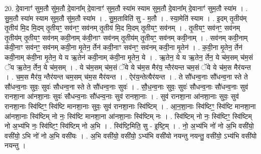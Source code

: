 \documentclass[17pt]{extarticle}
\begin{document}
20. दे॒वानाꣳ॑ सुम॒तौ सु॑म॒तौ दे॒वाना᳚म् दे॒वानाꣳ॑ सुम॒तौ स्या॑म स्याम सुम॒तौ दे॒वाना᳚म् दे॒वानाꣳ॑ सुम॒तौ स्या॑म । . सु॒म॒तौ स्या॑म स्याम सुम॒तौ सु॑म॒तौ स्या॑म । . सु॒म॒ताविति॑ सु - म॒तौ । . स्या॒मेति॑ स्याम । . इ॒दम् तृ॒तीय॑म् तृ॒तीय॑ मि॒द मि॒दम् तृ॒तीयꣳ॒॒ सव॑नꣳ॒॒ सव॑नम् तृ॒तीय॑ मि॒द मि॒दम् तृ॒तीयꣳ॒॒ सव॑नम् । . तृ॒तीयꣳ॒॒ सव॑नꣳ॒॒ सव॑नम् तृ॒तीय॑म् तृ॒तीयꣳ॒॒ सव॑नम् कवी॒नाम् क॑वी॒नाꣳ सव॑नम् तृ॒तीय॑म् तृ॒तीयꣳ॒॒ सव॑नम् कवी॒नाम् । . सव॑नम् कवी॒नाम् क॑वी॒नाꣳ सव॑नꣳ॒॒ सव॑नम् कवी॒ना मृ॒तेन॒ र्तेन॑ कवी॒नाꣳ सव॑नꣳ॒॒ सव॑नम् कवी॒ना मृ॒तेन॑ । . क॒वी॒ना मृ॒तेन॒ र्तेन॑ कवी॒नाम् क॑वी॒ना मृ॒तेन॒ ये य ऋ॒तेन॑ कवी॒नाम् क॑वी॒ना मृ॒तेन॒ ये । . ऋ॒तेन॒ ये य ऋ॒तेन॒ र्तेन॒ ये च॑म॒सम् च॑म॒सं ॅय ऋ॒तेन॒ र्तेन॒ ये च॑म॒सम् । . ये च॑म॒सम् च॑म॒सं ॅये ये च॑म॒स मैर॑य॒ न्तैर॑यन्त चम॒सं ॅये ये च॑म॒स मैर॑यन्त । . च॒म॒स मैर॑य॒ न्तैर॑यन्त चम॒सम् च॑म॒स मैर॑यन्त । . ऐर॑य॒न्तेत्यैर॑यन्त । . ते सौ॑धन्व॒नाः सौ॑धन्व॒ना स्ते ते सौ॑धन्व॒नाः सुवः॒ सुवः॑ सौधन्व॒ना स्ते ते सौ॑धन्व॒नाः सुवः॑ । . सौ॒ध॒न्व॒नाः सुवः॒ सुवः॑ सौधन्व॒नाः सौ॑धन्व॒नाः सुव॑ रानशा॒ना आ॑नशा॒नाः सुवः॑ सौधन्व॒नाः सौ॑धन्व॒नाः सुव॑ रानशा॒नाः । . सुव॑ रानशा॒ना आ॑नशा॒नाः सुवः॒ सुव॑ रानशा॒नाः स्वि॑ष्टिꣳ॒॒ स्वि॑ष्टि मानशा॒नाः सुवः॒ सुव॑ रानशा॒नाः स्वि॑ष्टिम् । . आ॒न॒शा॒नाः स्वि॑ष्टिꣳ॒॒ स्वि॑ष्टि मानशा॒ना आ॑नशा॒नाः स्वि॑ष्टिम् नो नः॒ स्वि॑ष्टि मानशा॒ना आ॑नशा॒नाः स्वि॑ष्टिम् नः । . स्वि॑ष्टिम् नो नः॒ स्वि॑ष्टिꣳ॒॒ स्वि॑ष्टिम् नो अ॒भ्य॑भि नः॒ स्वि॑ष्टिꣳ॒॒ स्वि॑ष्टिम् नो अ॒भि । . स्वि॑ष्टि॒मिति॒ सु - इ॒ष्टि॒म् । . नो॒ अ॒भ्य॑भि नो॑ नो अ॒भि वसी॑यो॒ वसी॑यो॒ ऽभि नो॑ नो अ॒भि वसी॑यः । . अ॒भि वसी॑यो॒ वसी॑यो॒ ऽभ्य॑भि वसी॑यो नयन्तु नयन्तु॒ वसी॑यो॒ ऽभ्य॑भि वसी॑यो नयन्तु । \newline
\end{document}

